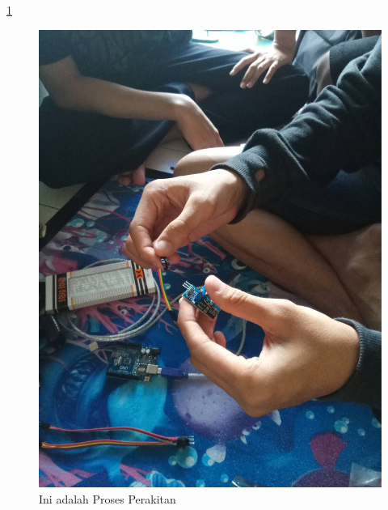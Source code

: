 \documentclass{article}
\begin{document}
  \ref{ar2}
  \begin{figure}[ht]
  \centerline{\includegraphics[width=1\textwidth]{../figures/ar2.jpg}}
  \caption{Ini adalah Proses Perakitan}
  \label{ar2}
  \end{figure}
\end{document}
